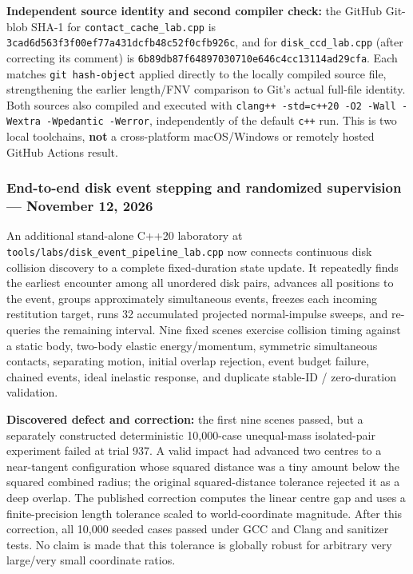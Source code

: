 \textbf{Independent source identity and second compiler check:} the GitHub Git-blob SHA-1 for \texttt{contact\_cache\_lab.cpp} is \texttt{3cad6d563f3f00ef77a431dcfb48c52f0cfb926c}, and for \texttt{disk\_ccd\_lab.cpp} (after correcting its comment) is \texttt{6b89db87f64897030710e646c4cc13114ad29cfa}. Each matches \texttt{git\ hash-object} applied directly to the locally compiled source file, strengthening the earlier length/FNV comparison to Git's actual full-file identity. Both sources also compiled and executed with \texttt{clang++\ -std=c++20\ -O2\ -Wall\ -Wextra\ -Wpedantic\ -Werror}, independently of the default \texttt{c++} run. This is two local toolchains, \textbf{not} a cross-platform macOS/Windows or remotely hosted GitHub Actions result.

\subsubsection{End-to-end disk event stepping and randomized supervision --- November 12, 2026}\label{appendix-3b67654799a2-end-to-end-disk-event-stepping-and-randomized-supervision-november-12-2026}

An additional stand-alone C++20 laboratory at \texttt{tools/labs/disk\_event\_pipeline\_lab.cpp} now connects continuous disk collision discovery to a complete fixed-duration state update. It repeatedly finds the earliest encounter among all unordered disk pairs, advances all positions to the event, groups approximately simultaneous events, freezes each incoming restitution target, runs 32 accumulated projected normal-impulse sweeps, and re-queries the remaining interval. Nine fixed scenes exercise collision timing against a static body, two-body elastic energy/momentum, symmetric simultaneous contacts, separating motion, initial overlap rejection, event budget failure, chained events, ideal inelastic response, and duplicate stable-ID / zero-duration validation.

\textbf{Discovered defect and correction:} the first nine scenes passed, but a separately constructed deterministic 10,000-case unequal-mass isolated-pair experiment failed at trial 937. A valid impact had advanced two centres to a near-tangent configuration whose squared distance was a tiny amount below the squared combined radius; the original squared-distance tolerance rejected it as a deep overlap. The published correction computes the linear centre gap and uses a finite-precision length tolerance scaled to world-coordinate magnitude. After this correction, all 10,000 seeded cases passed under GCC and Clang and sanitizer tests. No claim is made that this tolerance is globally robust for arbitrary very large/very small coordinate ratios.

